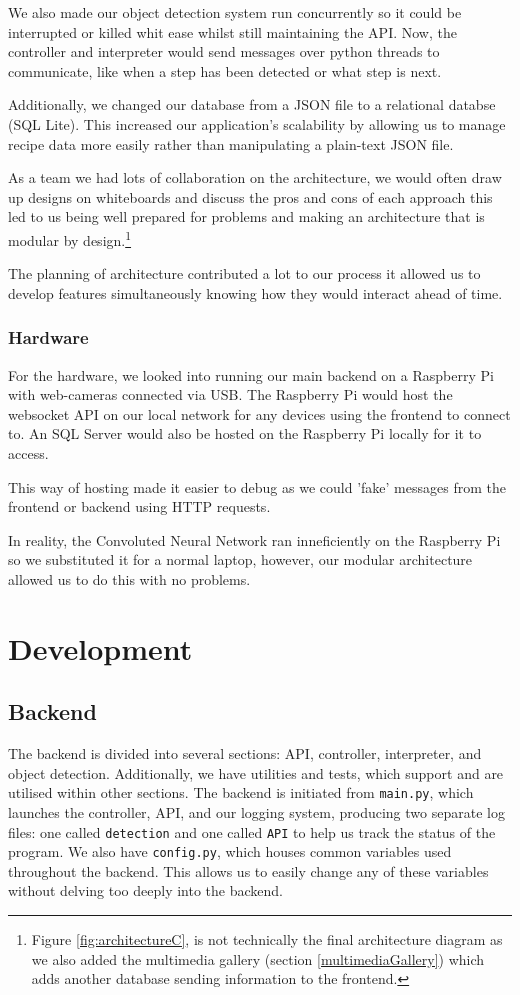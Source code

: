 \documentclass{article}
\begin{document}
    We also made our object detection system run concurrently so it could be interrupted or killed whit ease whilst still maintaining the API. Now, the controller and interpreter would send messages over python threads to communicate, like when a step has been detected or what step is next.

    Additionally, we changed our database from a JSON file to a relational databse (SQL Lite). This increased our application's scalability by allowing us to manage recipe data more easily rather than manipulating a plain-text JSON file.

    As a team we had lots of collaboration on the architecture, we would often draw up designs on whiteboards and discuss the pros and cons of each approach this led to us being well prepared for problems and making an architecture that is modular by design.\footnote{Figure \ref{fig:architectureC}, is not technically the final architecture diagram as we also added the multimedia gallery (section \ref{multimediaGallery}) which adds another database sending information to the frontend.}

    The planning of architecture contributed a lot to our process it allowed us to develop features simultaneously knowing how they would interact ahead of time.

    \subsubsection{Hardware}
    For the hardware, we looked into running our main backend on a Raspberry Pi with web-cameras connected via USB. The Raspberry Pi would host the websocket API on our local network for any devices using the frontend to connect to. An SQL Server would also be hosted on the Raspberry Pi locally for it to access.

    This way of hosting made it easier to debug as we could 'fake' messages from the frontend or backend using HTTP requests. 

    In reality, the Convoluted Neural Network ran inneficiently on the Raspberry Pi so we substituted it for a normal laptop, however, our modular architecture allowed us to do this with no problems.

    \section{Development}
    \subsection{Backend}
        The backend is divided into several sections: API, controller, interpreter, and object detection. Additionally, we have utilities and tests, which support and are utilised within other sections. The backend is initiated from \verb|main.py|, which launches the controller, API, and our logging system, producing two separate log files: one called \verb|detection| and one called \verb|API| to help us track the status of the program. We also have \verb|config.py|, which houses common variables used throughout the backend. This allows us to easily change any of these variables without delving too deeply into the backend.
\end{document}
